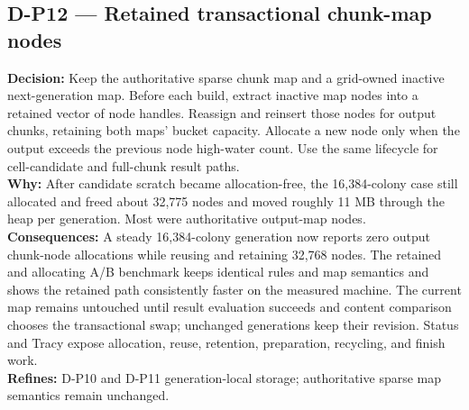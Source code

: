 \subsection*{D-P12 --- Retained transactional chunk-map nodes}
\begin{decisionbox}[title={D-P12 \quad 2026-08-08}]
\textbf{Decision:} Keep the authoritative sparse chunk map and a grid-owned
inactive next-generation map. Before each build, extract inactive map nodes into
a retained vector of node handles. Reassign and reinsert those nodes for output
chunks, retaining both maps' bucket capacity. Allocate a new node only when the
output exceeds the previous node high-water count. Use the same lifecycle for
cell-candidate and full-chunk result paths.\\
\textbf{Why:} After candidate scratch became allocation-free, the 16,384-colony
case still allocated and freed about 32,775 nodes and moved roughly 11 MB through
the heap per generation. Most were authoritative output-map nodes.\\
\textbf{Consequences:} A steady 16,384-colony generation now reports zero output
chunk-node allocations while reusing and retaining 32,768 nodes. The retained
and allocating A/B benchmark keeps identical rules and map semantics and shows
the retained path consistently faster on the measured machine. The current map
remains untouched until result evaluation succeeds and content comparison chooses
the transactional swap; unchanged generations keep their revision. Status and
Tracy expose allocation, reuse, retention, preparation, recycling, and finish
work.\\
\textbf{Refines:} D-P10 and D-P11 generation-local storage; authoritative sparse
map semantics remain unchanged.
\end{decisionbox}


